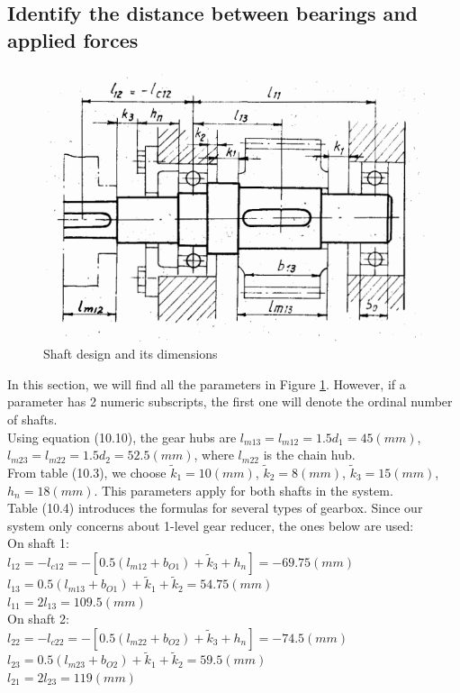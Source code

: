 \subsection{Identify the distance between bearings and applied forces}

\begin{figure}[ht]
	\centering	\includegraphics[width=\linewidth]{shaft1}
	\caption{Shaft design and its dimensions}
	\label{shaft}
\end{figure}

In this section, we will find all the parameters in Figure \ref{shaft}. However, if a parameter has 2 numeric subscripts, the first one will denote the ordinal number of shafts.\\
Using equation (10.10), the gear hubs are $ l_{m13} = l_{m12} = 1.5d_1 =  45\unit{(mm)} $, $ l_{m23} = l_{m22} = 1.5d_2 = 52.5\unit{(mm)} $, where $ l_{m22} $ is the chain hub.\\
From table (10.3), we choose $ \tilde{k}_1=10\unit{(mm)}$, $ \tilde{k}_2=8\unit{(mm)} $, $ \tilde{k}_3=15\unit{(mm)} $, $ h_n=18\unit{(mm)} $. This parameters apply for both shafts in the system.\\
Table (10.4) introduces the formulas for several types of gearbox. Since our system only concerns about 1-level gear reducer, the ones below are used:\\
On shaft 1:\\
$ l_{12} = -l_{c12} = -\left[ 0.5(l_{m12}+b_{O1})+\tilde{k}_3+h_n  \right] = -69.75 \unit{(mm)} $\\
$ l_{13} = 0.5(l_{m13}+b_{O1})+\tilde{k}_1+\tilde{k}_2 = 54.75 \unit{(mm)} $\\
$ l_{11} = 2l_{13} = 109.5 \unit{(mm)}$\\
On shaft 2:\\
$ l_{22} = -l_{c22} = -\left[ 0.5(l_{m22}+b_{O2})+\tilde{k}_3+h_n \right] = -74.5 \unit{(mm)} $\\
$ l_{23} = 0.5(l_{m23}+b_{O2})+\tilde{k}_1+\tilde{k}_2 = 59.5 \unit{(mm)} $\\
$ l_{21} = 2l_{23} = 119 \unit{(mm)}$

